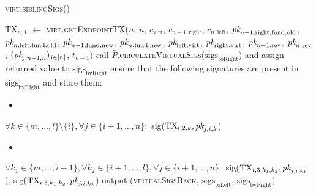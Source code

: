 \begin{center}
\begin{processbox}{\textsc{virt.siblingSigs}()}
\begin{algorithmic}[1]
        \State $\mathrm{TX}_{n, 1}$ $\gets$ \textsc{virt.getEndpointTX}($n$,
        $n$, $c_{\mathrm{virt}}$, $c_{n-1, \mathrm{right}}$, $c_{n,
        \mathrm{left}}$, $\textit{pk}_{n-1, \mathrm{right}, \mathrm{fund},
        \mathrm{old}}$, $\textit{pk}_{n, \mathrm{left}, \mathrm{fund}, \mathrm{old}}$,
        $\textit{pk}_{n-1, \mathrm{fund}, \mathrm{new}}$, $\textit{pk}_{n, \mathrm{fund},
        \mathrm{new}}$, $\textit{pk}_{\mathrm{left}, \mathrm{virt}}$,
        $\textit{pk}_{\mathrm{right}, \mathrm{virt}}$, $\textit{pk}_{n-1, \mathrm{rev}}$, $\textit{pk}_{n,
        \mathrm{rev}}$, $(\textit{pk}_{j, n-1, n})_{j \in [n]}$, $t_{n-1}$)
      \EndIf
      \Statex
      \State call
      $\bar{P}$.\textsc{circulateVirtualSigs}($\mathrm{sigs}_{\mathrm{toRight}}$)
      and assign returned value to $\mathrm{sigs}_{\mathrm{byRight}}$
      \State ensure that the following signatures are present in
      $\mathrm{sigs}_{\mathrm{byRight}}$ and store them:
      \begin{itemize}
        \item {}
      \end{itemize}
      \Indent
        \State $\forall k \in \{m, \dots, l\} \setminus \{i\}, \forall j \in
        \{i+1, \dots, n\}:$
        \Indent
          \State sig($\mathrm{TX}_{i, 2, k}, \textit{pk}_{j, i, k}$)
        \EndIndent
      \EndIndent
      \begin{itemize}
        \item {}
      \end{itemize}
      \Indent
        \State $\forall k_1 \in \{m, \dots, i-1\}, \forall k_2 \in \{i+1, \dots,
        l\}, \forall j \in \{i+1, \dots, n\}:$
        \Indent
          \State sig($\mathrm{TX}_{i, 3, k_1, k_2}, \textit{pk}_{j, i, k_1}$),
          sig($\mathrm{TX}_{i, 3, k_1, k_2}, \textit{pk}_{j, i, k_2}$)
        \EndIndent
      \EndIndent
      \State output (\textsc{virtualSigsBack},
      $\mathrm{sigs}_{\mathrm{toLeft}}$, $\mathrm{sigs}_{\mathrm{byRight}}$)
    \end{algorithmic}
  \end{processbox}
  \label{code:virtual-layer:sibling-sigs}
\end{center} \ \\

